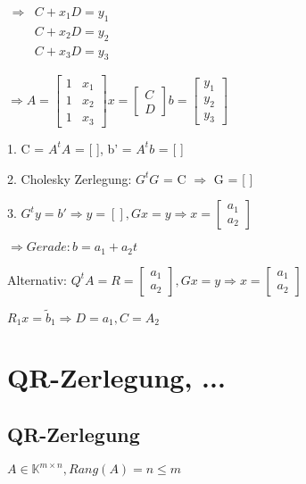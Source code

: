 \documentclass[12pt,a4paper]{article} %
\begin{document}
	$\begin{matrix}
		\Rightarrow & C + x_1D = y_1 \\
		& C + x_2D = y_2 \\
		& C + x_3D = y_3 
	\end{matrix}$
	
	$\Rightarrow A = \begin{bmatrix}
		1 & x_1 \\
		1 & x_2 \\
		1 & x_3 
	\end{bmatrix}
	x = 
	\begin{bmatrix}
		C \\
		D
	\end{bmatrix}
	b = 
	\begin{bmatrix}
		y_1 \\
		y_2 \\
		y_3
	\end{bmatrix}$
	
	1. C = $A^tA$ = [ ], b' = $A^tb$ = [ ]
	
	2. Cholesky Zerlegung: $G^tG$ = C $\Rightarrow$ G = [ ]
	
	3. $G^ty = b' \Rightarrow y = [ ], Gx = y \Rightarrow x = \begin{bmatrix}
		a_1 \\
		a_2
	\end{bmatrix}$
	
	$\Rightarrow Gerade: b = a_1 + a_2t$
	
	Alternativ: $Q^tA = R = \begin{bmatrix}
		a_1 \\
		a_2
	\end{bmatrix}
	, Gx = y \Rightarrow x = \begin{bmatrix}
	a_1 \\
	a_2
	\end{bmatrix}$
	
	$R_1x = \tilde{b}_1 \Rightarrow D = a_1, C = A_2$
	
	\newpage
	
	\section{QR-Zerlegung, ...}
	
	\subsection{QR-Zerlegung}
	
	$A \in \mathbb{K}^{m \times n}, Rang(A) = n \le m$ 
	
\end{document}
